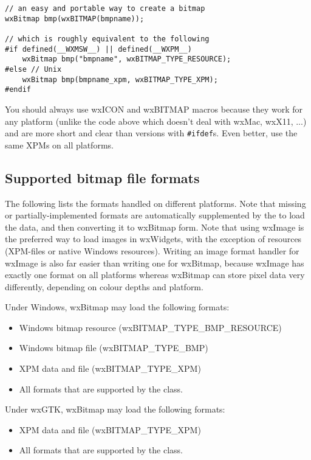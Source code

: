 \begin{verbatim}
// an easy and portable way to create a bitmap
wxBitmap bmp(wxBITMAP(bmpname));

// which is roughly equivalent to the following
#if defined(__WXMSW__) || defined(__WXPM__)
    wxBitmap bmp("bmpname", wxBITMAP_TYPE_RESOURCE);
#else // Unix
    wxBitmap bmp(bmpname_xpm, wxBITMAP_TYPE_XPM);
#endif
\end{verbatim}

You should always use wxICON and wxBITMAP macros because they work for any
platform (unlike the code above which doesn't deal with wxMac, wxX11, ...) and
are more short and clear than versions with {\tt \#ifdef}s. Even better,
use the same XPMs on all platforms.

\subsection{Supported bitmap file formats}\label{supportedbitmapformats}

The following lists the formats handled on different platforms. Note
that missing or partially-implemented formats are automatically supplemented
by the  to load the data, and then converting
it to wxBitmap form. Note that using wxImage is the preferred way to
load images in wxWidgets, with the exception of resources (XPM-files or
native Windows resources). Writing an image format handler for wxImage
is also far easier than writing one for wxBitmap, because wxImage has
exactly one format on all platforms whereas wxBitmap can store pixel data
very differently, depending on colour depths and platform.


Under Windows, wxBitmap may load the following formats:

\begin{itemize}\itemsep=0pt
\item Windows bitmap resource (wxBITMAP\_TYPE\_BMP\_RESOURCE)
\item Windows bitmap file (wxBITMAP\_TYPE\_BMP)
\item XPM data and file (wxBITMAP\_TYPE\_XPM)
\item All formats that are supported by the  class.
\end{itemize}

Under wxGTK, wxBitmap may load the following formats:

\begin{itemize}\itemsep=0pt
\item XPM data and file (wxBITMAP\_TYPE\_XPM)
\item All formats that are supported by the  class.
\end{itemize}

